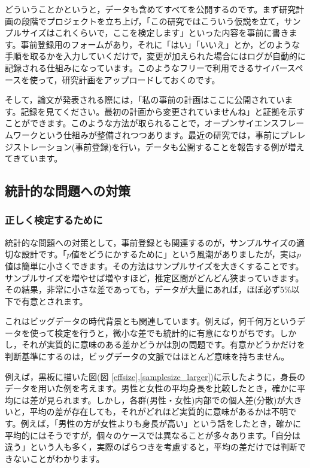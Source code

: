 \documentclass{ltjsbook}
\begin{document}
どういうことかというと，データも含めてすべてを公開するのです。まず研究計画の段階でプロジェクトを立ち上げ，「この研究ではこういう仮説を立て，サンプルサイズはこれくらいで，ここを検定します」といった内容を事前に書きます。事前登録用のフォームがあり，それに「はい」「いいえ」とか，どのような手順を取るかを入力していくだけで，変更が加えられた場合にはログが自動的に記録される仕組みになっています。このようなフリーで利用できるサイバースペースを使って，研究計画をアップロードしておくのです。

そして，論文が発表される際には，「私の事前の計画はここに公開されています。記録を見てください。最初の計画から変更されていませんね」と証拠を示すことができます。このような方法が取られることで，オープンサイエンスフレームワークという仕組みが整備されつつあります。最近の研究では，事前にプレレジストレーション(事前登録)を行い，データも公開することを報告する例が増えてきています。

\subsection{統計的な問題への対策}
\subsubsection{正しく検定するために}

統計的な問題への対策として，事前登録とも関連するのが，サンプルサイズの適切な設計です。「$p$値をどうにかするために」という風潮がありましたが，実は$p$値は簡単に小さくできます。その方法はサンプルサイズを大きくすることです。サンプルサイズを増やせば増やすほど，推定区間がどんどん狭まっていきます。その結果，非常に小さな差であっても，データが大量にあれば，ほぼ必ず5\%以下で有意とされます。

これはビッグデータの時代背景とも関連しています。例えば，何千何万というデータを使って検定を行うと，微小な差でも統計的に有意になりがちです。しかし，それが実質的に意味のある差かどうかは別の問題です。有意かどうかだけを判断基準にするのは，ビッグデータの文脈ではほとんど意味を持ちません。

例えば，黒板に描いた図(図 \ref{effsize},\ref{samplesize_larger})に示したように，身長のデータを用いた例を考えます。男性と女性の平均身長を比較したとき，確かに平均には差が見られます。しかし，各群(男性・女性)内部での個人差(分散)が大きいと，平均の差が存在しても，それがどれほど実質的に意味があるかは不明です。例えば，「男性の方が女性よりも身長が高い」という話をしたとき，確かに平均的にはそうですが，個々のケースでは異なることが多々あります。「自分は違う」という人も多く，実際のばらつきを考慮すると，平均の差だけでは判断できないことがわかります。
\end{document}
